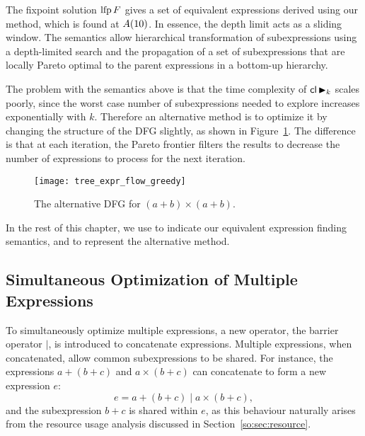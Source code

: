 The fixpoint solution $\operatorname{\mathrm{lfp}} F$ gives a set of equivalent expressions derived
using our method, which is found at $A({10})$. In essence, the depth limit
acts as a sliding window.  The semantics allow hierarchical transformation of
subexpressions using a depth-limited search and the propagation of a set of
subexpressions that are locally Pareto optimal to the parent expressions in a
bottom-up hierarchy.

The problem with the semantics above is that the time complexity of $\mathsf{cl}
\operatorname{\blacktriangleright}_k$ scales poorly, since the worst case number of subexpressions needed
to explore increases exponentially with $k$. Therefore an alternative method
is to optimize it by changing the structure of the DFG slightly, as shown in
Figure~\ref{so:fig:tree_expr_flow_greedy}. The difference is that at each
iteration, the Pareto frontier filters the results to decrease the number of
expressions to process for the next iteration.
\begin{figure}[ht]
    \centering
    \texttt{[image: tree\_expr\_flow\_greedy]}
    \caption{The alternative DFG for $(a + b) \times (a + b)$.
    }\label{so:fig:tree_expr_flow_greedy}
\end{figure}

In the rest of this chapter, we use \frontiertrace{} to indicate our equivalent
expression finding semantics, and \greedytrace{} to represent the alternative
method.


\subsection{Simultaneous Optimization of Multiple Expressions}

To simultaneously optimize multiple expressions, a new operator, the barrier
operator $\mid$, is introduced to concatenate expressions.  Multiple
expressions, when concatenated, allow common subexpressions to be shared.  For
instance, the expressions $a + (b + c)$ and $a \times (b + c)$ can concatenate
to form a new expression $e$:
\begin{equation}
    e = a + (b + c) \mid a \times (b + c),
\end{equation}
and the subexpression $b + c$ is shared within $e$, as this behaviour
naturally arises from the resource usage analysis discussed in
Section~\ref{so:sec:resource}.

